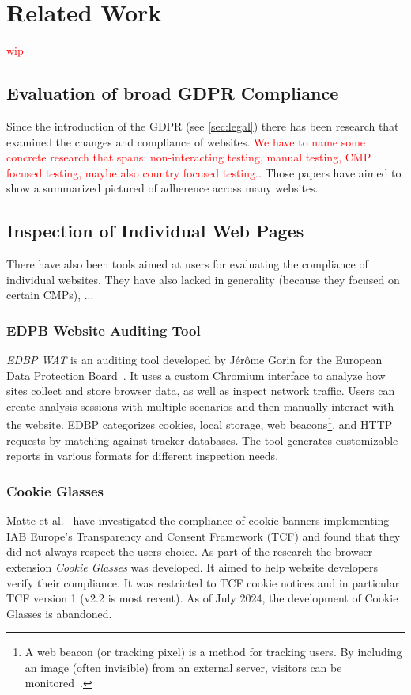 \chapter{Related Work}

\textcolor{red}{wip}

\section{Evaluation of broad GDPR Compliance}
Since the introduction of the GDPR (see \cref{sec:legal}) there has been research that examined the changes and compliance of websites.
\textcolor{red}{We have to name some concrete research that spans: non-interacting testing, manual testing, CMP focused testing, maybe also country focused testing.}. 
Those papers have aimed to show a summarized pictured of adherence across many websites.

\section{Inspection of Individual Web Pages}
There have also been tools aimed at users for evaluating the compliance of individual websites. 
They have also lacked in generality (because they focused on certain CMPs), ...

\subsection{EDPB Website Auditing Tool}
\emph{EDBP WAT} is an auditing tool developed by Jérôme Gorin for the European Data Protection Board~\cite{gorin2024edpb}.
It uses a custom Chromium interface to analyze how sites collect and store browser data, as well as inspect network traffic. 
Users can create analysis sessions with multiple scenarios and then manually interact with the website.
EDBP categorizes cookies, local storage, web beacons\footnote{
A web beacon (or tracking pixel) is a method for tracking users. 
By including an image (often invisible) from an external server, visitors can be monitored~\cite{smith1999web}.
}, and HTTP requests by matching against tracker databases.
The tool generates customizable reports in various formats for different inspection needs.

\subsection{Cookie Glasses}
Matte et al.~\cite{matte2020cookiebannersrespectchoice} have investigated the compliance of cookie banners implementing IAB Europe’s Transparency and Consent Framework (TCF) and found that they did not always respect the users choice.
As part of the research the browser extension \emph{Cookie Glasses} was developed.
It aimed to help website developers verify their compliance.
It was restricted to TCF cookie notices and in particular TCF version 1 (v2.2 is most recent).
As of July 2024, the development of Cookie Glasses is abandoned.

